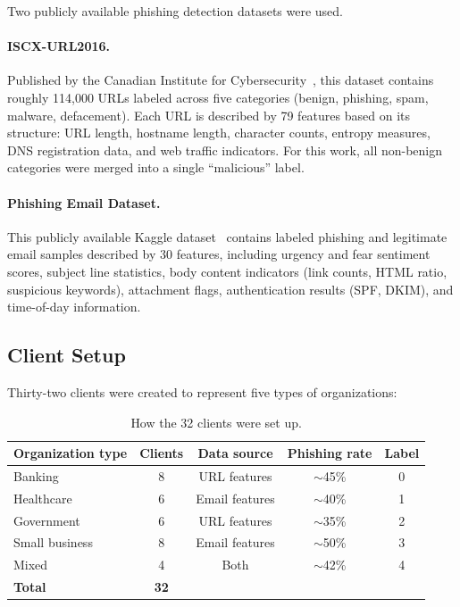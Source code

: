 \documentclass[information,article,submit,pdftex]{mdpi}
\begin{document}
Two publicly available phishing detection datasets were used.

\paragraph{ISCX-URL2016.} Published by the Canadian Institute for
Cybersecurity~\cite{mamun2016detecting}, this dataset contains roughly
114{,}000 URLs labeled across five categories (benign, phishing, spam, malware,
defacement). Each URL is described by 79 features based on its structure: URL
length, hostname length, character counts, entropy measures, DNS registration
data, and web traffic indicators. For this work, all non-benign categories were
merged into a single ``malicious'' label.

\paragraph{Phishing Email Dataset.} This publicly available Kaggle
dataset~\cite{subhajournal2023phishing} contains labeled phishing and legitimate
email samples described by 30 features, including urgency and fear sentiment
scores, subject line statistics, body content indicators (link counts, HTML ratio,
suspicious keywords), attachment flags, authentication results (SPF, DKIM), and
time-of-day information.

\subsection{Client Setup}

Thirty-two clients were created to represent five types of organizations:

\begin{table}[H]
\caption{How the 32 clients were set up.}\label{tab:clients}
\begin{tabular}{lcccc}
\toprule
\textbf{Organization type} & \textbf{Clients} & \textbf{Data source} &
  \textbf{Phishing rate} & \textbf{Label} \\
\midrule
Banking        & 8 & URL features   & $\sim$45\% & 0 \\
Healthcare     & 6 & Email features & $\sim$40\% & 1 \\
Government     & 6 & URL features   & $\sim$35\% & 2 \\
Small business & 8 & Email features & $\sim$50\% & 3 \\
Mixed          & 4 & Both           & $\sim$42\% & 4 \\
\midrule
\textbf{Total} & \textbf{32} & & & \\
\bottomrule
\end{tabular}
\end{table}
\end{document}
